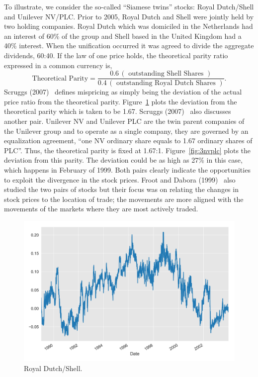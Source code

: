 To illustrate, we consider the so-called ``Siamese twins'' stocks: Royal Dutch/Shell and Unilever NV/PLC. Prior to 2005, Royal Dutch and Shell were jointly held by two holding companies. Royal Dutch which was domiciled in the Netherlands had an interest of 60\% of the group and Shell based in the United Kingdom had a 40\% interest. When the unification occurred it was agreed to divide the aggregate dividends, 60:40. If the law of one price holds, the theoretical parity ratio expressed in a common currency is,
	\[
	\text{Theoretical Parity}= \frac{0.6 \,(\text{ outstanding Shell Shares })}{0.4 \,(\text{ outstanding Royal Dutch Shares })}.
	\]
Scruggs (2007)~\cite{scruggs} defines mispricing as simply being the deviation of the actual price ratio from the theoretical parity. Figure~\ref{fig:3royal} plots the deviation from the theoretical parity which is taken to be 1.67. Scruggs (2007)~\cite{scruggs} also discusses another pair. Unilever NV and Unilever PLC are the twin parent companies of the Unilever group and to operate as a single company, they are governed by an equalization agreement, ``one NV ordinary share equals to 1.67 ordinary shares of PLC''. Thus, the theoretical parity is fixed at 1.67:1. Figure~\ref{fig:3nvplc} plots the deviation from this parity. The deviation could be as high as 27\% in this case, which happens in February of 1999. Both pairs clearly indicate the opportunities to exploit the divergence in the stock prices. Froot and Dabora (1999)~\cite{froot1999stock} also studied the two pairs of stocks but their focus was on relating the changes in stock prices to the location of trade; the movements are more aligned with the movements of the markets where they are most actively traded.

	\begin{figure}[!ht]
	\centering
	\includegraphics[width=\textwidth]{chapters/chapter_stat_ts/figures/rd_shell.png}
	\caption{Royal Dutch/Shell. \label{fig:3royal}}
	\end{figure}
	
